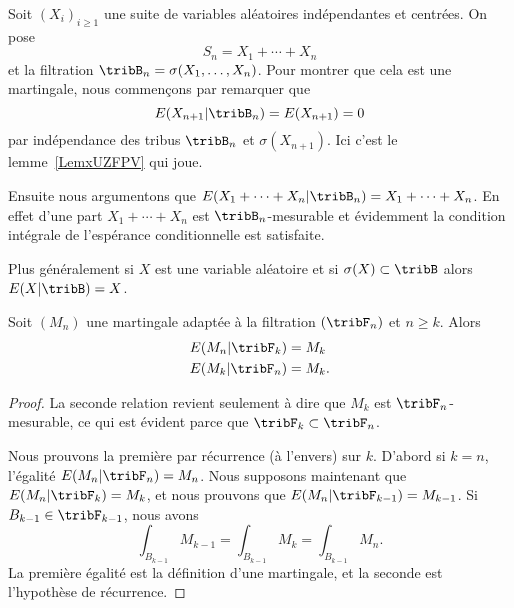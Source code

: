 \begin{example}     \label{ExtFFKTr}
	Soit \( (X_i)_{i\geq 1}\) une suite de variables aléatoires indépendantes et centrées. On pose
	\begin{equation}
		S_n=X_1+\cdots +X_n
	\end{equation}
	et la filtration \( \tribB_n=\sigma(X_1,\ldots, X_n)\). Pour montrer que cela est une martingale, nous commençons par remarquer que
	\begin{equation}
		E(X_{n+1}|\tribB_n)=E(X_{n+1})=0
	\end{equation}
	par indépendance des tribus \( \tribB_n\) et \( \sigma(X_{n+1})\). Ici c'est le lemme~\ref{LemxUZFPV} qui joue.

	Ensuite nous argumentons que \( E(X_1+\cdots +X_n|\tribB_n)=X_1+\cdots +X_n\). En effet d'une part \( X_1+\cdots +X_n\) est \( \tribB_n\)-mesurable et évidemment la condition intégrale de l'espérance conditionnelle est satisfaite.

	Plus généralement si \( X\) est une variable aléatoire et si \( \sigma(X)\subset\tribB\) alors \( E(X|\tribB)=X\).
\end{example}

\begin{lemma}   \label{LemqanhgJ}
	Soit \( (M_n)\) une martingale adaptée à la filtration \( (\tribF_n)\) et \( n\geq k\). Alors
	\begin{subequations}
		\begin{align}
			E(M_n|\tribF_k) & =M_k  \\
			E(M_k|\tribF_n) & =M_k.
		\end{align}
	\end{subequations}
\end{lemma}

\begin{proof}
	La seconde relation revient seulement à dire que \( M_k\) est \( \tribF_n\)-mesurable, ce qui est évident parce que \( \tribF_k\subset\tribF_n\).

	Nous prouvons la première par récurrence (à l'envers) sur \( k\). D'abord si \( k=n\), l'égalité \( E(M_n|\tribF_n)=M_n\). Nous supposons maintenant que \( E(M_n|\tribF_k)=M_k\), et nous prouvons que \( E(M_n|\tribF_{k-1})=M_{k-1}\). Si \( B_{k-1}\in \tribF_{k-1}\), nous avons
	\begin{equation}
		\int_{B_{k-1}}M_{k-1}=\int_{B_{k-1}}M_{k}=\int_{B_{k-1}}M_n.
	\end{equation}
	La première égalité est la définition d'une martingale, et la seconde est l'hypothèse de récurrence.
\end{proof}

